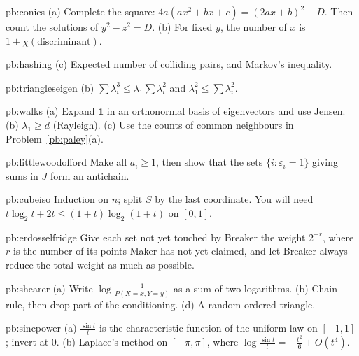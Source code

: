 \begin{hint}{pb:conics}
(a) Complete the square: $4a(ax^2+bx+c)=(2ax+b)^2-D$. Then count the solutions of $y^2-z^2=D$. (b) For fixed $y$, the number of
$x$ is $1+\chi(\text{discriminant})$.
\end{hint}

\begin{hint}{pb:hashing}
(c) Expected number of colliding pairs, and Markov's inequality.
\end{hint}

\begin{hint}{pb:triangleseigen}
(b) $\sum\lambda_i^3\le\lambda_1\sum\lambda_i^2$ and $\lambda_1^2\le\sum\lambda_i^2$.
\end{hint}

\begin{hint}{pb:walks}
(a) Expand $\mathbf1$ in an orthonormal basis of eigenvectors and use Jensen. (b) $\lambda_1\ge\bar d$ (Rayleigh). (c) Use the counts of
common neighbours in Problem~\ref{pb:paley}(a).
\end{hint}

\begin{hint}{pb:littlewoodofford}
Make all $a_i\ge1$, then show that the sets $\{i:\varepsilon_i=1\}$ giving sums in $J$ form an antichain.
\end{hint}

\begin{hint}{pb:cubeiso}
Induction on $n$; split $S$ by the last coordinate. You will need $t\log_2t+2t\le(1+t)\log_2(1+t)$ on $[0,1]$.
\end{hint}

\begin{hint}{pb:erdosselfridge}
Give each set not yet touched by Breaker the weight $2^{-r}$, where $r$ is the number of its points Maker has not yet claimed, and let Breaker always reduce the
total weight as much as possible.
\end{hint}

\begin{hint}{pb:shearer}
(a) Write $\log\frac1{P(X=x,Y=y)}$ as a sum of two logarithms. (b) Chain rule, then drop part of the conditioning. (d) A random ordered triangle.
\end{hint}

\begin{hint}{pb:sincpower}
(a) $\frac{\sin t}t$ is the characteristic function of the uniform law on $[-1,1]$; invert at $0$. (b) Laplace's method on $[-\pi,\pi]$,
where $\log\frac{\sin t}t=-\frac{t^2}6+O(t^4)$.
\end{hint}

